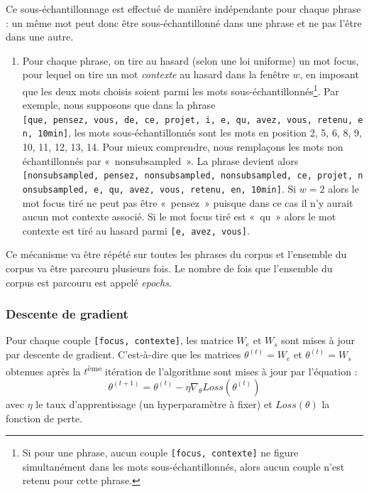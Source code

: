 \documentclass[11pt,french,french]{article}
\providecommand{\tightlist}{%
  \setlength{\parskip}{0pt}
  }
\let\rmarkdownfootnote\footnote%
\def\footnote{\protect\rmarkdownfootnote}
\begin{document}
Ce sous-échantillonnage est effectué de manière indépendante pour chaque
phrase : un même mot peut donc être sous-échantillonné dans une phrase
et ne pas l'être dans une autre.

\begin{enumerate}
\def\labelenumi{\arabic{enumi}.}
\setcounter{enumi}{1}
\tightlist
\item
  Pour chaque phrase, on tire au hasard (selon une loi uniforme) un mot
  focus, pour lequel on tire un mot \emph{contexte} au hasard dans la
  fenêtre \(w\), en imposant que les deux mots choisis soient parmi les
  mots sous-échantillonnés\footnote{Si pour une phrase, aucun couple
    \texttt{{[}focus,\ contexte{]}} ne figure simultanément dans les
    mots sous-échantillonnés, alors aucun couple n'est retenu pour cette
    phrase.}. Par exemple, nous supposons que dans la phrase
  \texttt{{[}que,\ pensez,\ vous,\ de,\ ce,\ projet,\ i,\ e,\ qu,\ avez,\ vous,\ retenu,\ en,\ 10min{]}},
  les mots sous-échantillonnés sont les mots en position 2, 5, 6, 8, 9,
  10, 11, 12, 13, 14. Pour mieux comprendre, nous remplaçons les mots
  non échantillonnés par «~nonsubsampled~». La phrase devient alors
  \texttt{{[}nonsubsampled,\ pensez,\ nonsubsampled,\ nonsubsampled,\ ce,\ projet,\ nonsubsampled,\ e,\ qu,\ avez,\ vous,\ retenu,\ en,\ 10min{]}}.
  Si \(w=2\) alors le mot focus tiré ne peut pas être «~pensez~» puisque
  dans ce cas il n'y aurait aucun mot contexte associé. Si le mot focus
  tiré est «~qu~» alors le mot contexte est tiré au hasard parmi
  \texttt{{[}e,\ avez,\ vous{]}}.
\end{enumerate}

Ce mécanisme va être répété sur toutes les phrases du corpus et
l'ensemble du corpus va être parcouru plusieurs fois. Le nombre de fois
que l'ensemble du corpus est parcouru est appelé \emph{epochs}.

\subsubsection{Descente de gradient}\label{subsec:descentedegradient}

Pour chaque couple \texttt{{[}focus,\ contexte{]}}, les matrice \(W_e\)
et \(W_s\) sont mises à jour par descente de gradient. C'est-à-dire que
les matrices \(\theta^{(t)} = W_e\) et \(\theta^{(t)} = W_s\) obtenues
après la \(t\)\textsuperscript{ème} itération de l'algorithme sont mises
à jour par l'équation : \[
\theta^{(t+1)} = \theta^{(t)} - \eta \nabla_\theta Loss(\theta^{(t)})
\] avec \(\eta\) le taux d'apprentissage (un hyperparamètre à fixer) et
\(Loss(\theta)\) la fonction de perte.
\end{document}
